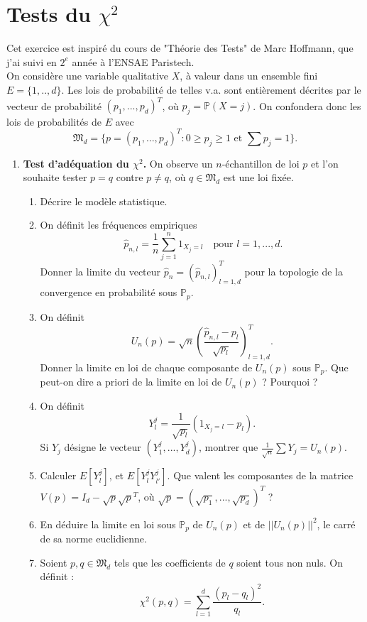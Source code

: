 \section{ Tests du $\chi^2$}

Cet exercice est inspiré du cours de "Théorie des Tests" de Marc Hoffmann, que j'ai suivi en $2^e$ année à l'ENSAE Paristech.\\


On considère une variable qualitative $X$, à valeur dans un ensemble fini $E=\{1,..,d\}$. Les lois de probabilité de telles v.a. sont entièrement décrites par le vecteur de probabilité $(p_1,...,p_d)^T$, où $p_j=\mathbb P(X=j)$. On confondera donc les lois de probabilités de $E$ avec 
\[\mathfrak M_d=\{p=(p_1,...,p_d)^T : 0\geq p_j\geq 1 \text{ et } \sum p_j = 1\}.\]

\begin{enumerate}
\item \textbf{Test d'adéquation du $\chi^2$.} On observe un $n$-échantillon de loi $p$ et l'on souhaite tester $p=q$ contre $p\neq q$, où $q\in \mathfrak M_d$ est une loi fixée.
\begin{enumerate}
\item Décrire le modèle statistique.
\item On définit les fréquences empiriques
\[\ \hat p_{n,l} = \frac{1}{n}\sum_{j=1}^n 1_{X_j=l}\quad\text{pour }l=1,...,d.\]
Donner la limite du vecteur $\hat p_n=(\hat p_{n,l} )_{l=1,d}^T$ pour la topologie de la convergence en probabilité sous $\mathbb P_p$.
\item On définit
\[U_n(p)=\sqrt{n}(\frac{\hat p_{n,l}-p_l}{\sqrt{p_l}})_{l=1,d}^T.\]
Donner la limite en loi de chaque composante de $U_n(p)$ sous $\mathbb P_p$. Que peut-on dire a priori de la limite en loi de $U_n(p)$ ? Pourquoi ?
\item On définit
\[Y_l^j = \frac{1}{\sqrt{p_l}}(1_{X_j=l}-p_l).\]
Si $Y_j$ désigne le vecteur $(Y_1^j, ... ,Y_d^j) $, montrer que $\frac{1}{\sqrt{n}}\sum Y_j = U_n(p)$.
\item Calculer $E[Y^j _l ]$, et $E[Y^j _l Y_{l'}^j]$. Que valent les composantes de la matrice $V(p)= I_d- \sqrt{p}\sqrt{p}^T$, où $\sqrt{p}=(\sqrt{p_1}, ... , \sqrt{p_d})^T$ ?
\item En déduire la limite en loi sous $\mathbb P_p$ de $U_n(p)$ et de $||U_n(p)||^2$, le carré de sa norme euclidienne.
\item Soient $p,q\in \mathfrak M_d$ tels que les coefficients de $q$ soient tous non nuls. On définit :
\[\chi^2 (p,q) = \sum_{l=1}^d\frac{(p_l-q_l)^2}{q_l}.\]

\end{enumerate}
\end{enumerate}
